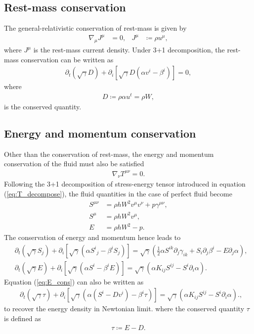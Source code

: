 \subsection{Rest-mass conservation}
\label{section2.1.2}
The general-relativistic conservation of rest-mass is given by
\begin{align}
    \nabla_\mu J^\mu &= 0, & J^\mu &\coloneqq \rho u^\mu,
\end{align}
where $J^\mu$ is the rest-mass current density.
Under 3+1 decomposition, the rest-mass conservation can be written as
\begin{align}\label{eq:mass_cons}
    \partial_t \left(\sqrt{\gamma}D\right) + \partial_i \left[\sqrt{\gamma} D \left(\alpha v^i - \beta^i \right) \right] = 0,
\end{align}
where
\begin{align}
    D \coloneqq \rho \alpha u^t = \rho W,
\end{align}
is the conserved quantity.

\subsection{Energy and momentum conservation}
\label{section2.1.3}
Other than the conservation of rest-mass, the energy and momentum conservation of the fluid must also be satisfied
\begin{align}
    \nabla_\nu T^{\mu\nu} = 0.
\end{align}
Following the 3+1 decomposition of stress-energy tensor introduced in equation (\ref{eq:T_decompose}),
the fluid quantities in the case of perfect fluid become
\begin{align}
    S^{\mu\nu} &= \rho h W^2 v^\mu v^\nu + p \gamma^{\mu\nu}, \\
    S^\mu &= \rho h W^2 v^\mu, \\
    E &= \rho h W^2 - p.
\end{align}
The conservation of energy and momentum hence leads to
\begin{align}
    &\partial_t \left( \sqrt{\gamma} S_j \right) + \partial_i \left[\sqrt{\gamma} \left(\alpha S^i{}_j - \beta^i S_j\right) \right]
    = \sqrt{\gamma} \left(\frac{1}{2} \alpha S^{ik} \partial_j \gamma_{ik} + S_i \partial_j \beta^i - E \partial_j \alpha\right), \label{eq:mom_cons} \\
    &\partial_t \left( \sqrt{\gamma} E \right) + \partial_i \left[ \sqrt{\gamma} \left(\alpha S^i - \beta^i E \right) \right]
    = \sqrt{\gamma} \left(\alpha K_{ij} S^{ij} - S^i \partial_i \alpha \right). \label{eq:E_cons}
\end{align}
Equation (\ref{eq:E_cons}) can also be written as
\begin{align}
    &\partial_t \left( \sqrt{\gamma} \tau \right) + \partial_i \left[\sqrt{\gamma} \left(\alpha\left(S^i - D v^i \right) - \beta^i \tau \right)\right]
    = \sqrt{\gamma} \left(\alpha K_{ij} S^{ij} - S^i \partial_i \alpha \right). \label{eq:tau_cons},
\end{align}
to recover the energy density in Newtonian limit.
where the conserved quantity $\tau$ is defined as
\begin{align}
    \tau \coloneqq E - D.
\end{align}

